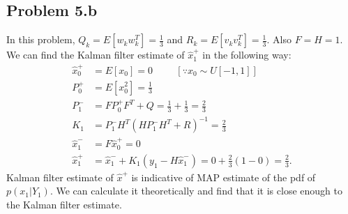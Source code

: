 \subsection*{Problem 5.b}
In this problem, $Q_k=E[w_kw_k^T] = \frac{1}{3}$ and $R_k = E[v_kv_k^T] = \frac{1}{3}$. Also $F=H=1$.
\newline
We can find the Kalman filter estimate of $\hat{x}_1^{+}$ in the following way:
\begin{align*}
	\hat{x}_0^{+} &= E[x_0] = 0 \hspace{1cm}[\because x_0 \sim U[-1,1]]\\
	P_0^{+} &= E[x_0^2] = \frac{1}{3}\\
	P_1^- &= FP_0^+F^T + Q = \frac{1}{3}+\frac{1}{3} = \frac{2}{3}\\
	K_1 &= P_1^-H^T(HP_1^-H^T+R)^{-1} = \frac{2}{3}\\
	\hat{x}_1^- &= F\hat{x}_0^+ = 0\\
	\hat{x}_1^+ &= \hat{x}_1^-+K_1(y_1-H\hat{x}_1^-) = 0+\frac{2}{3}(1-0) = \frac{2}{3}.
\end{align*}
Kalman filter estimate of $\hat{x}^+$ is indicative of MAP estimate of the pdf of $p(x_1|Y_1)$. We can calculate it theoretically and find that it is close enough to the Kalman filter estimate.


